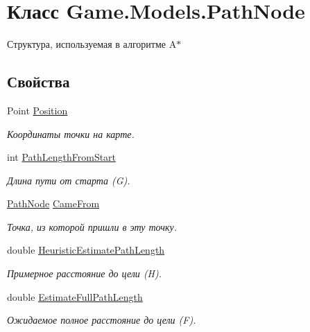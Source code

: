 \hypertarget{class_game_1_1_models_1_1_path_node}{}\section{Класс Game.\+Models.\+Path\+Node}
\label{class_game_1_1_models_1_1_path_node}


Структура, используемая в алгоритме A$\ast$  


\subsection*{Свойства}
\begin{DoxyCompactItemize}
\item 
Point \hyperlink{class_game_1_1_models_1_1_path_node_a6cece93479e46b7e12f1cb55a5ed8efc}{Position}
\begin{DoxyCompactList}\small\item\em Координаты точки на карте. \end{DoxyCompactList}\item 
int \hyperlink{class_game_1_1_models_1_1_path_node_ad0b667e8fc2377ce0c41576cfa382b15}{Path\+Length\+From\+Start}
\begin{DoxyCompactList}\small\item\em Длина пути от старта (G). \end{DoxyCompactList}\item 
\hyperlink{class_game_1_1_models_1_1_path_node}{Path\+Node} \hyperlink{class_game_1_1_models_1_1_path_node_a08e45c8ce9e42586702501c483b7c947}{Came\+From}
\begin{DoxyCompactList}\small\item\em Точка, из которой пришли в эту точку. \end{DoxyCompactList}\item 
double \hyperlink{class_game_1_1_models_1_1_path_node_a09eae29bd7b3159ca4cd3c370a1dafa6}{Heuristic\+Estimate\+Path\+Length}
\begin{DoxyCompactList}\small\item\em Примерное расстояние до цели (H). \end{DoxyCompactList}\item 
double \hyperlink{class_game_1_1_models_1_1_path_node_ac199fbf81d9f45f6b0a2ada32016d4e8}{Estimate\+Full\+Path\+Length}
\begin{DoxyCompactList}\small\item\em Ожидаемое полное расстояние до цели (F). \end{DoxyCompactList}\end{DoxyCompactItemize}


